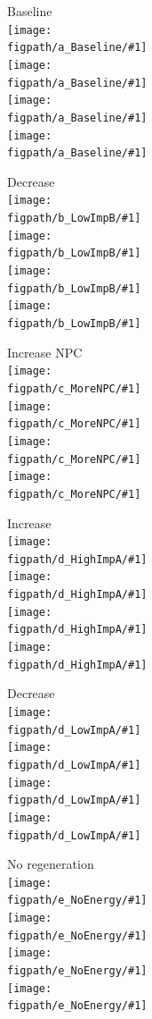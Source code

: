 \documentclass[12pt,notitlepage]{article}
\def\[#1\]{\begin{align}#1\end{align}}
\begin{document}
\begin{figure}[!h]
	\centering
	
	\vspace{-1\baselineskip}
	
	\newcommand{\figpath}{20211018-Appli/checkpoint/\checkpoint/plot_ss}
	\newcommand{\figures}{\fig{Free ImpA}\\\fig{Free ImpB}\\\fig{Free CAS}\\\fig{Free NLS}}
	
	\begin{minipage}{0.32\textwidth}
		\centering
		Baseline \\[0.5\baselineskip]
		\newcommand\fig[1]{\texttt{[image: \\figpath/a\_Baseline/\#1]}}
		\figures
	\end{minipage}
	\hfill
	\begin{minipage}{0.32\textwidth}
		\centering
		Decrease  \\[0.5\baselineskip]
		\newcommand\fig[1]{\texttt{[image: \\figpath/b\_LowImpB/\#1]}}
		\figures
	\end{minipage}
	\hfill
	\begin{minipage}{0.32\textwidth}
		\centering
		Increase NPC \\[0.5\baselineskip]
		\newcommand\fig[1]{\texttt{[image: \\figpath/c\_MoreNPC/\#1]}}
		\figures
	\end{minipage}

	\vspace{\baselineskip}

	\begin{minipage}{0.32\textwidth}
		\centering
		Increase  \\[0.5\baselineskip]
		\newcommand\fig[1]{\texttt{[image: \\figpath/d\_HighImpA/\#1]}}
		\figures
	\end{minipage}
	\hfill
	\begin{minipage}{0.32\textwidth}
		\centering
		Decrease  \\[0.5\baselineskip]
		\newcommand\fig[1]{\texttt{[image: \\figpath/d\_LowImpA/\#1]}}
		\figures
	\end{minipage}
	\hfill
	\begin{minipage}{0.32\textwidth}
		\centering
		No  regeneration \\[0.5\baselineskip]
		\newcommand\fig[1]{\texttt{[image: \\figpath/e\_NoEnergy/\#1]}}
		\figures
	\end{minipage}
	

\end{figure}
\end{document}
